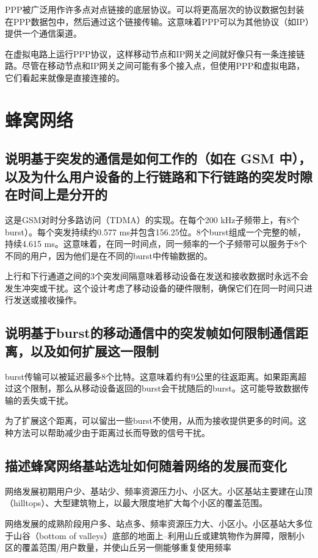 PPP被广泛用作许多点对点链接的底层协议。可以将更高层次的协议数据包封装在PPP数据包中，然后通过这个链接传输。这意味着PPP可以为其他协议（如IP）提供一个通信渠道。

在虚拟电路上运行PPP协议，这样移动节点和IP网关之间就好像只有一条连接链路。尽管在移动节点和IP网关之间可能有多个接入点，但使用PPP和虚拟电路，它们看起来就像是直接连接的。

\section{蜂窝网络}

\subsection{说明基于突发的通信是如何工作的（如在 GSM 中），以及为什么用户设备的上行链路和下行链路的突发时隙在时间上是分开的}

这是GSM对时分多路访问（TDMA）的实现。在每个200 kHz子频带上，有8个burst）。每个突发持续约0.577 ms并包含156.25位。8个burst组成一个完整的帧，持续4.615 ms。这意味着，在同一时间点，同一频率的一个子频带可以服务于8个不同的用户，因为他们是在不同的burst中传输数据的。

上行和下行通道之间的3个突发间隔意味着移动设备在发送和接收数据时永远不会发生冲突或干扰。这个设计考虑了移动设备的硬件限制，确保它们在同一时间只进行发送或接收操作。

\subsection{说明基于burst的移动通信中的突发帧如何限制通信距离，以及如何扩展这一限制}

burst传输可以被延迟最多8个比特。这意味着约有9公里的往返距离。如果距离超过这个限制，那么从移动设备返回的burst会干扰随后的burst。这可能导致数据传输的丢失或干扰。

为了扩展这个距离，可以留出一些burst不使用，从而为接收提供更多的时间。这种方法可以帮助减少由于距离过长而导致的信号干扰。

\subsection{描述蜂窝网络基站选址如何随着网络的发展而变化}

网络发展初期用户少、基站少、频率资源压力小、小区大。小区基站主要建在山顶（hilltops）、大型建筑物上，以最大限度地扩大每个小区的覆盖范围。

网络发展的成熟阶段用户多、站点多、频率资源压力大、小区小。小区基站大多位于山谷（bottom of valleys）底部的地面上--利用山丘或建筑物作为屏障，限制小区的覆盖范围/用户数量，并使山丘另一侧能够重复使用频率

